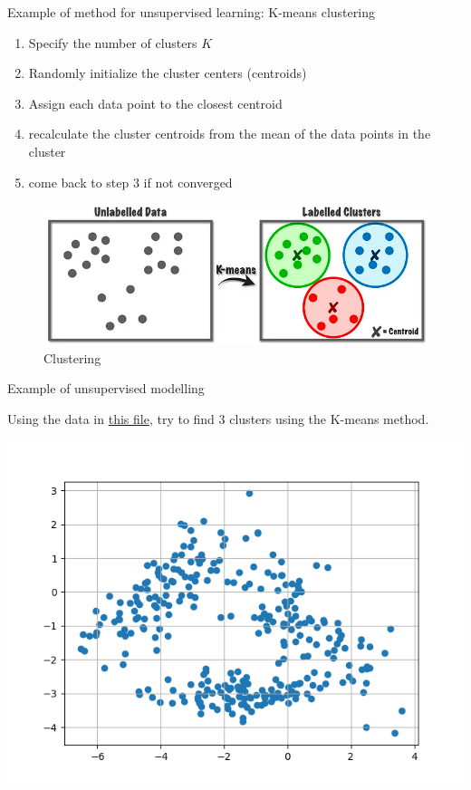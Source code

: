 \documentclass{beamer}
\begin{document}
\begin{frame}{Example of method for unsupervised learning: K-means clustering}
  \begin{enumerate}
    \item Specify the number of clusters $K$
    \item Randomly initialize the cluster centers (centroids)
    \item Assign each data point to the closest centroid
    \item recalculate the cluster centroids from the mean of the data points in the cluster
    \item come back to step 3 if not converged
  \end{enumerate}
  \begin{figure}
    \includegraphics[width=0.5\linewidth]{kmeans}
    \caption{Clustering}
    \label{fig:clustering}
  \end{figure}
\end{frame}

\begin{frame}{Example of unsupervised modelling}
  \begin{Exercise}[title={Unsupervised learning}]
    Using the data in \href{https://raw.githubusercontent.com/Biocomputing-Teaching/Data-Science-with-Python/main/code/datasets/clusterdata.csv}{this file}, try to find 3 clusters using the K-means method.
    \begin{center}
     \includegraphics[width=0.6\linewidth]{data}
    \end{center}
  \end{Exercise}
\end{frame}
\end{document}
